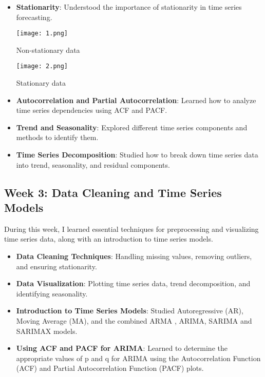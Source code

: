 \documentclass{article} %
\begin{document}
\begin{itemize}
    \item \textbf{Stationarity}: Understood the importance of stationarity in time series forecasting.

    \texttt{[image: 1.png]}
    \caption{Non-stationary data}
    \texttt{[image: 2.png]}
    \caption{Stationary data}

    
    \item \textbf{Autocorrelation and Partial Autocorrelation}: Learned how to analyze time series dependencies using ACF and PACF.
    \item \textbf{Trend and Seasonality}: Explored different time series components and methods to identify them.
    \item \textbf{Time Series Decomposition}: Studied how to break down time series data into trend, seasonality, and residual components.
\end{itemize}

\subsection{Week 3: Data Cleaning and Time Series Models}

During this week, I learned essential techniques for preprocessing and visualizing time series data, along with an introduction to time series models.

\begin{itemize}
    \item \textbf{Data Cleaning Techniques}: Handling missing values, removing outliers, and ensuring stationarity.
    \item \textbf{Data Visualization}: Plotting time series data, trend decomposition, and identifying seasonality.
    \item \textbf{Introduction to Time Series Models}: Studied Autoregressive (AR), Moving Average (MA), and the combined ARMA , ARIMA, SARIMA and SARIMAX models.
    \item \textbf{Using ACF and PACF for ARIMA}: Learned to determine the appropriate values of p and q for ARIMA using the Autocorrelation Function (ACF) and Partial Autocorrelation Function (PACF) plots.
\end{itemize}
\end{document}
